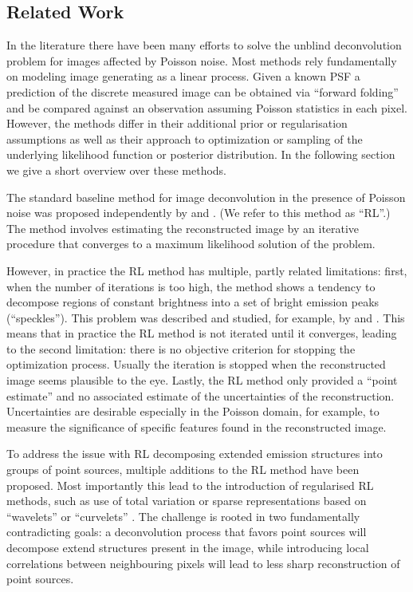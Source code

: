 \documentclass[twocolumn, lineno]{aastex631}
\begin{document}
    \subsection{Related Work}
    \label{sec:related}
    In the literature there have been many efforts to solve the unblind deconvolution problem for images affected by Poisson noise. Most methods rely fundamentally on modeling image generating as a linear process. Given a known PSF a prediction of the discrete measured image can be obtained via \enquote{forward folding} and be compared against an observation assuming Poisson statistics in each pixel. However, the methods differ in their additional prior or regularisation assumptions as well as their approach to optimization or sampling of the underlying likelihood function or posterior distribution. In the following section we give a short overview over these methods.
    
    The standard baseline method for image deconvolution in the presence of Poisson noise was proposed independently by \cite{Richardson1972} and \cite{Lucy1974}. (We refer to this method as \enquote{RL}.) The method involves estimating the reconstructed image by an iterative procedure that converges to a maximum likelihood solution of the problem.
    
    However, in practice the RL method has multiple, partly related limitations: first, when the number of iterations is too high, the method shows a tendency to decompose regions of constant brightness into a set of bright emission peaks (\enquote{speckles}). This problem was described and studied, for example,  by \cite{Reeves1995} and \cite{Fish1995}. This means that in practice the RL method is not iterated until it converges, leading to the second limitation: there is no objective criterion for stopping the optimization process. Usually the iteration is stopped when the reconstructed image seems plausible to the eye. 
    Lastly, the RL method only provided a \enquote{point estimate} and no associated estimate of the uncertainties of the reconstruction. Uncertainties are desirable especially in the Poisson domain, for example, to measure the significance of specific features found in the reconstructed image.
    
    To address the issue with RL decomposing extended emission structures into groups of point sources, multiple additions to the RL method  have been proposed. Most importantly this lead to the introduction of regularised RL methods, such as use of total variation \citep{Dey2006} or sparse representations based on \enquote{wavelets} or \enquote{curvelets} \citep{Starck2003}. The challenge is rooted in two fundamentally contradicting goals: a deconvolution process that favors point sources will decompose extend structures present in the image, while introducing local correlations between neighbouring pixels will lead to less sharp reconstruction of point sources.
\end{document}
